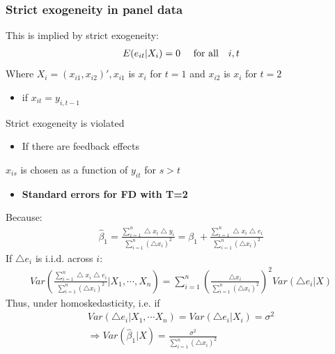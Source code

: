 \documentclass[a4paper,twoside,11pt]{article}
\begin{document}
\subsubsection{Strict exogeneity in panel data}
This is implied by strict exogeneity:
\begin{equation*}
\begin{aligned}
E(e_{it}|X_i)=0 \ \ \ \ \textmd{for all} \ \ \ i,t
\end{aligned}
\end{equation*}
Where $X_i = (x_{i1} , x_{i2})', x_{i1}$ is $x_i$ for $t=1$ and $x_{i2}$ is $x_i$ for $t=2$
\begin{itemize}
    \item if $x_{it} = y_{i,t-1}$
\end{itemize}
Strict exogeneity is violated 
\begin{itemize}
    \item If there are feedback effects
\end{itemize}
$x_{is}$ is chosen as a function of $y_{it}$ for $s>t$ 
\begin{itemize}
    \item \textbf{Standard errors for FD with T=2}
\end{itemize}
Because:
\begin{equation*}
\begin{aligned}
\hat{\beta}_1 = \frac{\sum^n_{i=1} \bigtriangleup x_i \bigtriangleup y_i}{\sum^n_{i=1} (\bigtriangleup x_i)^2} = \beta_1 + \frac{\sum^n_{i=1} \bigtriangleup x_i \bigtriangleup e_i}{\sum^n_{i=1} (\bigtriangleup x_i)^2}
\end{aligned}
\end{equation*}
If $\bigtriangleup e_i$ is i.i.d. across $i$:
\begin{equation*}
\begin{aligned}
Var( \frac{\sum^n_{i=1} \bigtriangleup x_i \bigtriangleup e_i}{\sum^n_{i=1} (\bigtriangleup x_i)^2} | X_1, \cdots ,X_n) = \sum^n_{i=1} (\frac{\bigtriangleup x_i}{\sum^n_{i=1}(\bigtriangleup x_i)^2 })^2 Var(\bigtriangleup e_i | X)
\end{aligned}
\end{equation*}
Thus, under homoskedasticity, i.e. if
\begin{equation*}
\begin{aligned}
Var(\bigtriangleup e_i | X_1, \cdots X_n) = Var(\bigtriangleup e_i | X_i ) = \sigma^2 \\
\Rightarrow Var(\hat{\beta}_1 | X) = \frac{\sigma^2}{\sum^n_{i=1} (\bigtriangleup x_i)^2}
\end{aligned}
\end{equation*}
\end{document}
